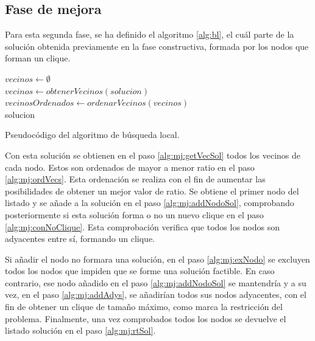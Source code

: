 \subsection{Fase de mejora}
\label{sec:faseBusqueda}
Para esta segunda fase, se ha definido el algoritmo \ref{alg:bl}, el cuál parte de la solución obtenida previamente en la fase constructiva, formada por los nodos que forman un clique.

\begin{algorithm}
	$ vecinos \gets \emptyset $ \\[0.2cm] \label{alg:mj:vecVacios}
	$ vecinos \gets obtenerVecinos(solucion)$ \\[0.2cm] \label{alg:mj:getVecSol}
	$ vecinosOrdenados \gets ordenarVecinos(vecinos)$ \\[0.2cm] \label{alg:mj:ordVecs}
	\Return solucion \label{alg:mj:rtSol}
	\caption{Pseudocódigo del algoritmo de búsqueda local.}
	\label{alg:bl}
\end{algorithm}

Con esta solución se obtienen en el paso \ref{alg:mj:getVecSol} todos los vecinos de cada nodo. Estos son ordenados de mayor a menor ratio en el paso \ref{alg:mj:ordVecs}. Esta ordenación se realiza con el fin de aumentar las posibilidades de obtener un mejor valor de ratio. Se obtiene el primer nodo del listado y se añade a la solución en el paso \ref{alg:mj:addNodoSol}, comprobando posteriormente si esta solución forma o no un nuevo clique en el paso \ref{alg:mj:conNoClique}. Esta comprobación verifica que todos los nodos son adyacentes entre sí, formando un clique.

Si añadir el nodo no formara una solución, en el paso \ref{alg:mj:exNodo} se excluyen todos los nodos que impiden que se forme una solución factible.
En caso contrario, ese nodo añadido en el paso \ref{alg:mj:addNodoSol} se mantendría y a su vez, en el paso \ref{alg:mj:addAdys}, se añadirían todos sus nodos adyacentes, con el fin de obtener un clique de tamaño máximo, como marca la restricción del problema.
Finalmente, una vez comprobados todos los nodos se devuelve el listado solución en el paso \ref{alg:mj:rtSol}.



